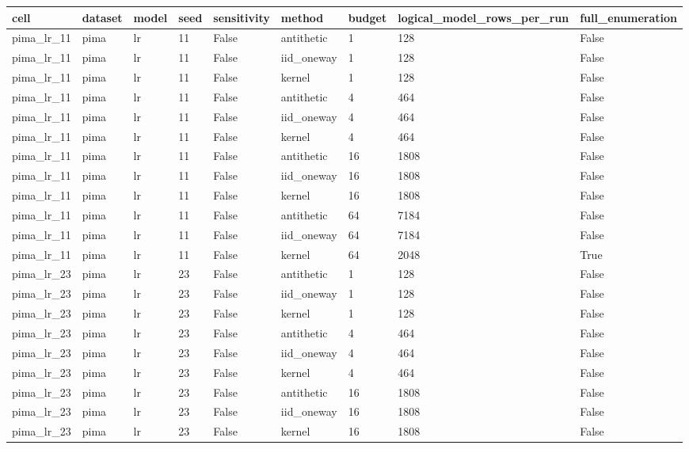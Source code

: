 \begin{tabular}{lllllllll}
\toprule
cell & dataset & model & seed & sensitivity & method & budget & logical\_model\_rows\_per\_run & full\_enumeration \\
\midrule
pima\_lr\_11 & pima & lr & 11 & False & antithetic & 1 & 128 & False \\
pima\_lr\_11 & pima & lr & 11 & False & iid\_oneway & 1 & 128 & False \\
pima\_lr\_11 & pima & lr & 11 & False & kernel & 1 & 128 & False \\
pima\_lr\_11 & pima & lr & 11 & False & antithetic & 4 & 464 & False \\
pima\_lr\_11 & pima & lr & 11 & False & iid\_oneway & 4 & 464 & False \\
pima\_lr\_11 & pima & lr & 11 & False & kernel & 4 & 464 & False \\
pima\_lr\_11 & pima & lr & 11 & False & antithetic & 16 & 1808 & False \\
pima\_lr\_11 & pima & lr & 11 & False & iid\_oneway & 16 & 1808 & False \\
pima\_lr\_11 & pima & lr & 11 & False & kernel & 16 & 1808 & False \\
pima\_lr\_11 & pima & lr & 11 & False & antithetic & 64 & 7184 & False \\
pima\_lr\_11 & pima & lr & 11 & False & iid\_oneway & 64 & 7184 & False \\
pima\_lr\_11 & pima & lr & 11 & False & kernel & 64 & 2048 & True \\
pima\_lr\_23 & pima & lr & 23 & False & antithetic & 1 & 128 & False \\
pima\_lr\_23 & pima & lr & 23 & False & iid\_oneway & 1 & 128 & False \\
pima\_lr\_23 & pima & lr & 23 & False & kernel & 1 & 128 & False \\
pima\_lr\_23 & pima & lr & 23 & False & antithetic & 4 & 464 & False \\
pima\_lr\_23 & pima & lr & 23 & False & iid\_oneway & 4 & 464 & False \\
pima\_lr\_23 & pima & lr & 23 & False & kernel & 4 & 464 & False \\
pima\_lr\_23 & pima & lr & 23 & False & antithetic & 16 & 1808 & False \\
pima\_lr\_23 & pima & lr & 23 & False & iid\_oneway & 16 & 1808 & False \\
pima\_lr\_23 & pima & lr & 23 & False & kernel & 16 & 1808 & False \\

\end{tabular}
